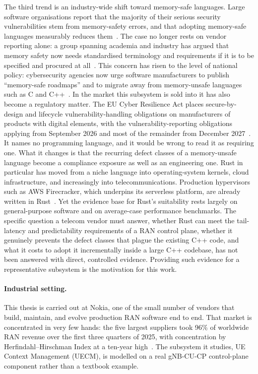 \documentclass[english,twoside,openright,a4paper,censored,csm,software-track-2020]{HYthesisML}
\begin{document}
The third trend is an industry-wide shift toward memory-safe languages. Large
software organisations report that the majority of their serious security vulnerabilities
stem from memory-safety errors, and that adopting memory-safe languages measurably reduces
them~\cite{msrc2019memory,google2022android,vanderstoep2025android,google2024securebydesign}.
The case no longer rests on vendor reporting alone: a group spanning academia and industry has
argued that memory safety now needs standardised terminology and requirements if it is to be
specified and procured at all~\cite{watson2025memorysafety}. This concern has risen to the level of national
policy: cybersecurity agencies now urge software manufacturers to publish ``memory-safe
roadmaps'' and to migrate away from memory-unsafe languages such as C and
C++~\cite{cisa2023memorysafe,oncd2024building}. In the market this subsystem is sold into it has
also become a regulatory matter. The EU Cyber Resilience Act places secure-by-design and
lifecycle vulnerability-handling obligations on manufacturers of products with digital elements,
with the vulnerability-reporting obligations applying from September 2026 and most of the
remainder from December 2027~\cite{eu2024cra}. It names no programming language, and it would be wrong to read it as
requiring one. What it changes is that the recurring defect classes of a memory-unsafe language
become a compliance exposure as well as an engineering one. Rust in particular has moved from a niche
language into operating-system kernels, cloud infrastructure, and increasingly into
telecommunications. Production hypervisors such as AWS Firecracker, which underpins its
serverless platform, are already written in Rust~\cite{agache2020firecracker}. Yet the evidence base for Rust's suitability rests largely on
general-purpose software and on average-case performance benchmarks. The specific question a
telecom vendor must answer, whether Rust can meet the tail-latency and predictability
requirements of a RAN control plane, whether it genuinely prevents the defect classes that
plague the existing C++ code, and what it costs to adopt it incrementally inside a large C++
codebase, has not been answered with direct, controlled evidence. Providing such evidence
for a representative subsystem is the motivation for this work.

\paragraph{Industrial setting.}
This thesis is carried out at Nokia, one of the small number of vendors that build, maintain,
and evolve production RAN software end to end. That market is concentrated in very few hands:
the five largest suppliers took 96\% of worldwide RAN revenue over the first three quarters of
2025, with concentration by Herfindahl--Hirschman Index at a ten-year
high~\cite{delloro2025ran3q,delloro2026ran}. The subsystem it studies, UE Context
Management (UECM), is modelled on a real gNB-CU-CP control-plane component rather than a
textbook example.
\end{document}

